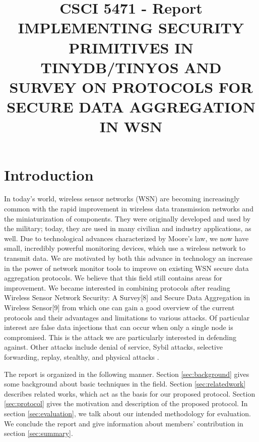 \documentclass[a4paper]{article}
\title{CSCI 5471 - Report\\
IMPLEMENTING SECURITY PRIMITIVES IN TINYDB/TINYOS AND \\
SURVEY ON PROTOCOLS FOR SECURE DATA AGGREGATION IN WSN}
\begin{document}
%
\maketitle

%



%
\section{Introduction}
\label{sec:intro}

In today's world, wireless sensor networks (WSN) are becoming increasingly
common with the rapid improvement in wireless data transmission networks and
the miniaturization of components. They were originally developed and used by
the military; today, they are used in many civilian and industry applications,
as well. Due to technological advances characterized by Moore's law, we now
have small, incredibly powerful monitoring devices, which use a wireless
network to transmit data. We are motivated by both this advance in technology
an increase in the power of network monitor tools to improve on existing WSN
secure data aggregation protocols. We believe that this field still contains
areas for improvement. We became interested in combining protocols after
reading Wireless Sensor Network Security: A Survey[8] and Secure Data
Aggregation in Wireless Sensor[9] from which one can gain a good overview of
the current protocols and their advantages and limitations to various
attacks. Of particular interest are false data injections that can occur when
only a single node is compromised. This is the attack we are particularly
interested in defending against. Other attacks include denial of service,
Sybil attacks, selective forwarding, replay, stealthy, and physical attacks
\cite{Alzaid08}.

The report is organized in the following manner. Section \ref{sec:background}
gives some background about basic techniques in the field. Section 
\ref{sec:relatedwork} describes related works, which act as the basis
for our proposed protocol. Section \ref{sec:protocol} gives
the motivation and description of the proposed protocol. In section
\ref{sec:evaluation}, we talk about our intended methodology
for evaluation. We conclude the report and give information
about members' contribution in section \ref{sec:summary}.
\end{document}
